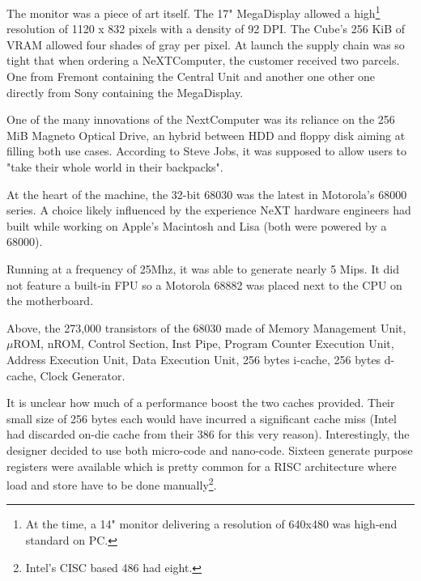 The monitor was a piece of art itself. The 17" MegaDisplay allowed a high\footnote{At the time, a 14" monitor delivering a resolution of 640x480 was high-end standard on PC.} resolution of 1120 x 832 pixels with a density of 92 DPI. The Cube's 256 KiB of VRAM allowed four shades of gray per pixel. At launch the supply chain was so tight that when ordering a NeXTComputer, the customer received two parcels. One from Fremont containing the Central Unit and another one  other one directly from Sony containing the MegaDisplay.





\begin{figure}[H]
\centering
{}
\end{figure}
\par
One of the many innovations of the NextComputer was its reliance on the 256 MiB Magneto Optical Drive, an hybrid between HDD and floppy disk aiming at filling both use cases. According to Steve Jobs, it was supposed to allow users to "take their whole world in their backpacks".\\
\par
At the heart of the machine, the 32-bit 68030 was the latest in Motorola's 68000 series. A choice likely influenced by the experience NeXT hardware engineers had built while working on Apple's Macintosh and Lisa (both were powered by a 68000).\\
\par
 Running at a frequency of 25Mhz, it was able to generate nearly 5 Mips. It did not feature a built-in FPU so a Motorola 68882 was placed next to the CPU on the motherboard. %



\begin{figure}[H]
\centering
{}
\end{figure}
\par
\vspace{-3mm}
Above, the 273,000 transistors of the 68030 made of  Memory Management Unit,  $\mu$ROM,  nROM,  Control Section,  Inst Pipe,  Program Counter Execution Unit,  Address Execution Unit,  Data Execution Unit,  256 bytes i-cache,  256 bytes d-cache,  Clock Generator.\\         
\par
It is unclear how much of a performance boost the two caches provided. Their small size of 256 bytes each would have incurred a significant cache miss (Intel had discarded on-die cache from their 386 for this very reason). Interestingly, the designer decided to use both micro-code and nano-code. Sixteen generate purpose registers were available which is pretty common for a RISC architecture where load and store have to be done manually\footnote{Intel's CISC based 486 had eight.}.
\pagebreak
 


